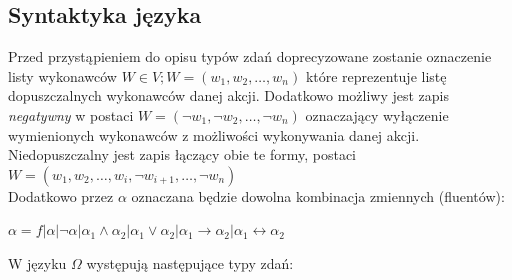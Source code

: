 \documentclass{article}
\begin{document}
\subsection{Syntaktyka języka}
Przed przystąpieniem do opisu typów zdań doprecyzowane zostanie oznaczenie listy wykonawców $W \in V; W=(w_{1}, w_{2}, \dots, w_{n})$ które reprezentuje listę dopuszczalnych wykonawców danej akcji. Dodatkowo możliwy jest zapis \textit{negatywny} w postaci $W=(\neg w_{1}, \neg w_{2}, \dots, \neg w_{n})$ oznaczający wyłączenie wymienionych wykonawców z możliwości wykonywania danej akcji. Niedopuszczalny jest zapis łączący obie te formy, postaci $W=(w_{1}, w_{2}, \dots, w_{i}, \neg w_{i+1}, \dots, \neg w_{n})$\\
Dodatkowo przez $\alpha$ oznaczana będzie dowolna kombinacja zmiennych (fluentów): 
\begin{center}
$\alpha= f | \alpha | \neg\alpha | \alpha_{1} \land \alpha_{2} | \alpha_{1} \lor \alpha_{2} | \alpha_{1} \to \alpha_{2} | \alpha_{1} \leftrightarrow \alpha_{2} $
\end{center}
W języku  $\Omega$ występują następujące typy zdań:
\end{document}
